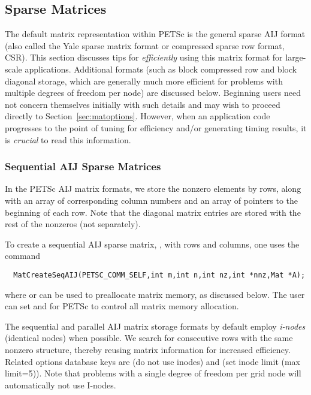 \subsection{Sparse Matrices}
\label{sec:matsparse}

 
The default matrix representation within PETSc is the general sparse
AIJ format (also called the Yale sparse matrix format or compressed
sparse row format, CSR).  This section discusses tips for {\em
efficiently} using this matrix format for large-scale
applications. Additional formats (such as block compressed row and
block diagonal storage, which are generally much more efficient for
problems with multiple degrees of freedom per node) are discussed
below.  Beginning users need not concern themselves initially with
such details and may wish to proceed directly to
Section~\ref{sec:matoptions}.  However, when an application code
progresses to the point of tuning for efficiency and/or generating
timing results, it is {\em crucial} to read this information.

\subsubsection{Sequential AIJ Sparse Matrices}

In the PETSc AIJ matrix formats, we store the nonzero elements
by rows, along with an array of corresponding column numbers and
an array of pointers to the beginning of each row.  Note that the
diagonal matrix entries are stored with the rest of the nonzeros (not
separately). 

To create a sequential AIJ sparse matrix, , 
 with  rows and  columns,
one uses the command
\begin{verbatim}
  MatCreateSeqAIJ(PETSC_COMM_SELF,int m,int n,int nz,int *nnz,Mat *A);
\end{verbatim}
where  or  can be used to preallocate matrix memory,
as discussed below. The user can set  and  for PETSc to control all matrix memory allocation.

The sequential and parallel AIJ matrix storage formats by default
employ {\em i-nodes} (identical nodes) when possible.  We search for
consecutive rows with the same nonzero structure, thereby reusing
matrix information for increased efficiency.  Related options database
keys are  (do not use inodes) and  (set inode limit (max limit=5)).
Note that problems with a single degree of freedom per grid node
will automatically not use I-nodes.

